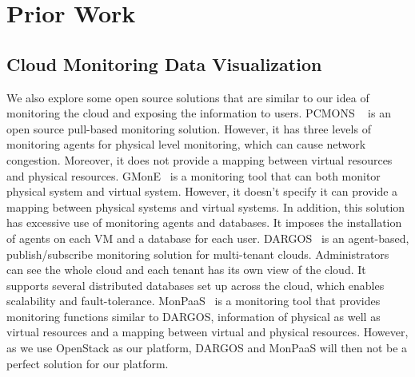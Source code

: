 

\section{Prior Work}
\label{sec:PriorWork}



\subsection{Cloud Monitoring Data Visualization}

  We also explore some open source solutions that are similar to our idea of monitoring the cloud and exposing the information to users. PCMONS ~\cite{chaves2011toward} is an open source pull-based monitoring solution. However, it has three levels of monitoring agents for physical level monitoring, which can cause network congestion. Moreover, it does not provide a mapping between virtual resources and physical resources. 
  GMonE~\cite{montes2013gmone} is a monitoring tool that can both monitor physical system and virtual system. However, it doesn't specify it can provide a mapping between physical systems and virtual systems. In addition, this solution has excessive use of monitoring agents and databases. It imposes the installation of agents on each VM and a database for each user. 
  DARGOS~\cite{povedano2013dargos}  is an agent-based, publish/subscribe monitoring solution for multi-tenant clouds. Administrators can see the whole cloud and each tenant has its own view of the cloud. It supports several distributed databases set up across the cloud, which enables scalability and fault-tolerance. MonPaaS~\cite{alcaraz2015monpaas} is a monitoring tool that provides monitoring functions similar to DARGOS, information of physical as well as virtual resources and a mapping between virtual and physical resources. However, as we use OpenStack as our platform, DARGOS and MonPaaS will then not be a perfect solution for our  platform.